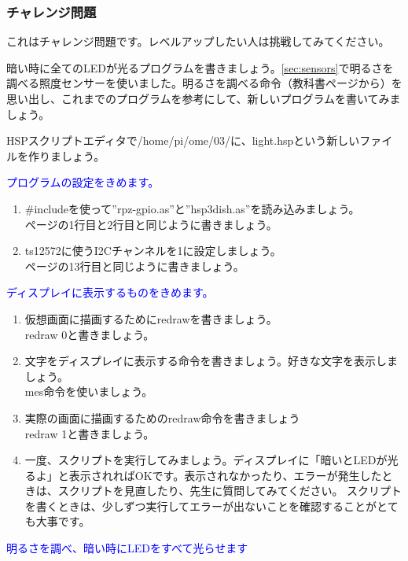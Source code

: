 \subsubsection{チャレンジ問題}
これはチャレンジ問題です。レベルアップしたい人は挑戦してみてください。

暗い時に全てのLEDが光るプログラムを書きましょう。\ref{sec:sensors}で明るさを調べる照度センサーを使いました。明るさを調べる命令（教科書\pageref{sec:sensors}ページから）を思い出し、これまでのプログラムを参考にして、新しいプログラムを書いてみましょう。\\
\begin{enumerate}
\renewcommand{\theenumii}{\arabic{enumii}}
\renewcommand{\labelenumii}{\theenumi.\theenumii}
\item HSPスクリプトエディタで/home/pi/ome/03/に、light.hspという新しいファイルを作りましょう。
\textcolor{blue}{\item プログラムの設定をきめます。}
\begin{enumerate}
\item \#includeを使って”rpz-gpio.as”と”hsp3dish.as”を読み込みましょう。\\
\pageref{sensors.hsp}ページの1行目と2行目と同じように書きましょう。
\item ts12572に使うI2Cチャンネルを1に設定しましょう。\\
\pageref{sensors.hsp}ページの13行目と同じように書きましょう。
\end{enumerate}
\textcolor{blue}{\item ディスプレイに表示するものをきめます。}
\begin{enumerate}
\item 仮想画面に描画するためにredrawを書きましょう。\\
redraw 0と書きましょう。
\item 文字をディスプレイに表示する命令を書きましょう。好きな文字を表示しましょう。\\
mes命令を使いましょう。
\item 実際の画面に描画するためのredraw命令を書きましょう\\
redraw 1と書きましょう。
\item 一度、スクリプトを実行してみましょう。ディスプレイに「暗いとLEDが光るよ」と表示されればOKです。表示されなかったり、エラーが発生したときは、スクリプトを見直したり、先生に質問してみてください。
スクリプトを書くときは、少しずつ実行してエラーが出ないことを確認することがとても大事です。
\end{enumerate}
\textcolor{blue}{\item 明るさを調べ、暗い時にLEDをすべて光らせます}

\end{enumerate}

